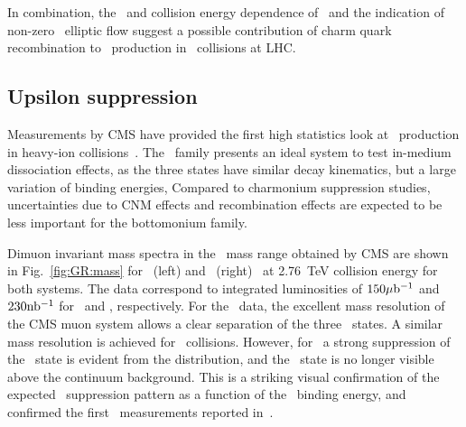 In combination, the \pT\ and collision energy dependence of \jpsi \Raa\ and 
the indication of non-zero \jpsi\ elliptic flow suggest a possible  
contribution of charm quark recombination to \jpsi\ production in \PbPb\ collisions
at LHC.

\subsection{Upsilon suppression}

Measurements by CMS have provided the first high statistics look at \PgU\
production in heavy-ion collisions~\cite{CMS_Y_2010}.
The \PgU\ family presents an ideal system to test in-medium dissociation effects,
as the three states have similar decay kinematics, but a large variation of binding energies,
Compared to charmonium suppression studies, uncertainties due
to CNM effects and recombination effects are expected to be
less important for the bottomonium family.

Dimuon invariant mass spectra in the \PgU\ mass range obtained by CMS are shown in 
Fig.~\ref{fig:GR:mass} for \PbPb\ (left) and \pp\ (right)~\cite{Chatrchyan:2012lxa}
at 2.76~TeV collision energy for both systems. 
The data correspond to integrated luminosities of $150\mathrm{\mu b^{-1}}$ and $230 \mathrm{nb^{-1}}$ for
\PbPb\ and \pp, respectively. For the \pp\ data, the excellent mass resolution of the CMS muon system
allows a clear separation of the three \PgUn\ states. A similar mass resolution is achieved 
for \PbPb\ collisions.
However, for \PbPb\ a strong suppression of the \PgUb\ state is evident from the 
distribution, and the \PgUc\ state is no longer visible above the continuum background. 
This is a striking visual confirmation of the expected
\PgU\ suppression pattern as a function of the \PgUn\ binding energy, and confirmed the 
first \PgU\ measurements reported in~\cite{CMS_Y_2010}.


